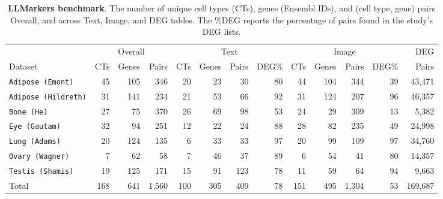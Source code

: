 \documentclass[10pt,twocolumn]{article}
\theoremstyle{plain}
\theoremstyle{definition}
\theoremstyle{remark}
\begin{document}
\begin{table}[ht!]
  \centering
  \caption{\textbf{LLMarkers benchmark}. The number of unique cell types (CTs), genes (Ensembl IDs), and (cell type, gene) pairs Overall, and across Text, Image, and DEG tables. The \%DEG reports the percentage of pairs found in the study's DEG lists.}
  \label{tab:benchmark}%
  \small
  \begin{tabular}{@{}l rrr rrrr rrrr r@{}}
  \toprule
   & \multicolumn{3}{c}{Overall} & \multicolumn{4}{c}{Text} & \multicolumn{4}{c}{Image} & DEG \\
  \cmidrule(lr){2-4} \cmidrule(lr){5-8} \cmidrule(lr){9-12} \cmidrule(lr){13-13}
  Dataset & CTs & Genes & Pairs & CTs & Genes & Pairs & DEG\% & CTs & Genes & Pairs & DEG\% & Pairs \\
  \midrule
  \texttt{Adipose (Emont)}    &  45 & 105 &   346 &  20 &  23 &   30 &  80 &  44 & 104 &  344 &  39 & 43{,}471 \\
  \texttt{Adipose (Hildreth)} &  31 & 141 &   234 &  21 &  53 &   66 &  92 &  31 & 124 &  207 &  96 & 46{,}357 \\
  \texttt{Bone (He)}          &  27 &  75 &   370 &  26 &  69 &   98 &  53 &  24 &  29 &  309 &  13 &  5{,}382 \\
  \texttt{Eye (Gautam)}       &  32 &  94 &   251 &  12 &  22 &   24 &  88 &  28 &  82 &  235 &  49 & 24{,}998 \\
  \texttt{Lung (Adams)}       &  20 & 124 &   135 &   6 &  33 &   33 &  97 &  20 &  99 &  109 &  97 & 34{,}760 \\
  \texttt{Ovary (Wagner)}     &   7 &  62 &    58 &   7 &  46 &   37 &  89 &   6 &  54 &   41 &  80 & 14{,}357 \\
  \texttt{Testis (Shamis)}    &  19 & 125 &   171 &  15 &  91 &  123 &  78 &  11 &  59 &   64 &  94 &  9{,}663 \\
  \midrule
  Total              & 168 & 641 & 1{,}560 & 100 & 305 &  409 &  78 & 151 & 495 & 1{,}304 &  53 & 169{,}687 \\
  \bottomrule
  \end{tabular}
\end{table}
\end{document}
